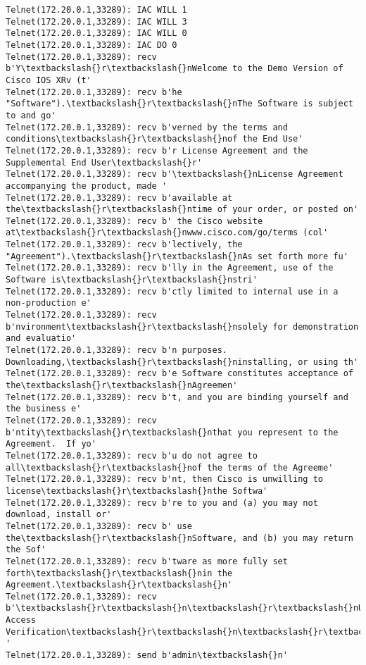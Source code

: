 \documentclass[11pt]{article}
\begin{document}
\begin{Verbatim}[commandchars=\\\{\}]
Telnet(172.20.0.1,33289): IAC WILL 1
Telnet(172.20.0.1,33289): IAC WILL 3
Telnet(172.20.0.1,33289): IAC WILL 0
Telnet(172.20.0.1,33289): IAC DO 0
Telnet(172.20.0.1,33289): recv b'Y\textbackslash{}r\textbackslash{}nWelcome to the Demo Version of Cisco IOS XRv (t'
Telnet(172.20.0.1,33289): recv b'he "Software").\textbackslash{}r\textbackslash{}nThe Software is subject to and go'
Telnet(172.20.0.1,33289): recv b'verned by the terms and conditions\textbackslash{}r\textbackslash{}nof the End Use'
Telnet(172.20.0.1,33289): recv b'r License Agreement and the Supplemental End User\textbackslash{}r'
Telnet(172.20.0.1,33289): recv b'\textbackslash{}nLicense Agreement accompanying the product, made '
Telnet(172.20.0.1,33289): recv b'available at the\textbackslash{}r\textbackslash{}ntime of your order, or posted on'
Telnet(172.20.0.1,33289): recv b' the Cisco website at\textbackslash{}r\textbackslash{}nwww.cisco.com/go/terms (col'
Telnet(172.20.0.1,33289): recv b'lectively, the "Agreement").\textbackslash{}r\textbackslash{}nAs set forth more fu'
Telnet(172.20.0.1,33289): recv b'lly in the Agreement, use of the Software is\textbackslash{}r\textbackslash{}nstri'
Telnet(172.20.0.1,33289): recv b'ctly limited to internal use in a non-production e'
Telnet(172.20.0.1,33289): recv b'nvironment\textbackslash{}r\textbackslash{}nsolely for demonstration and evaluatio'
Telnet(172.20.0.1,33289): recv b'n purposes.  Downloading,\textbackslash{}r\textbackslash{}ninstalling, or using th'
Telnet(172.20.0.1,33289): recv b'e Software constitutes acceptance of the\textbackslash{}r\textbackslash{}nAgreemen'
Telnet(172.20.0.1,33289): recv b't, and you are binding yourself and the business e'
Telnet(172.20.0.1,33289): recv b'ntity\textbackslash{}r\textbackslash{}nthat you represent to the Agreement.  If yo'
Telnet(172.20.0.1,33289): recv b'u do not agree to all\textbackslash{}r\textbackslash{}nof the terms of the Agreeme'
Telnet(172.20.0.1,33289): recv b'nt, then Cisco is unwilling to license\textbackslash{}r\textbackslash{}nthe Softwa'
Telnet(172.20.0.1,33289): recv b're to you and (a) you may not download, install or'
Telnet(172.20.0.1,33289): recv b' use the\textbackslash{}r\textbackslash{}nSoftware, and (b) you may return the Sof'
Telnet(172.20.0.1,33289): recv b'tware as more fully set forth\textbackslash{}r\textbackslash{}nin the Agreement.\textbackslash{}r\textbackslash{}n'
Telnet(172.20.0.1,33289): recv b'\textbackslash{}r\textbackslash{}n\textbackslash{}r\textbackslash{}nUser Access Verification\textbackslash{}r\textbackslash{}n\textbackslash{}r\textbackslash{}nUsername: '
Telnet(172.20.0.1,33289): send b'admin\textbackslash{}n'

\end{Verbatim}
\end{document}
